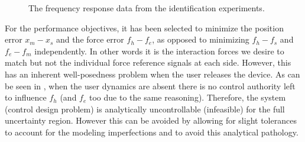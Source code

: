 \begin{figure}%
\centering
{}
\caption{The frequency response data from the identification experiments.}%
\label{fig:app:idfrd}%
\end{figure}

For the performance objectives, it has been selected to minimize the position error $x_m-x_s$ and 
the force error $f_h-f_e$, as opposed to minimizing $f_h-f_s$ and $f_e-f_m$ independently. In other words
it is the interaction forces we desire to match but not the individual force reference signals at each side. 
However, this has an inherent well-posedness problem when the user releases the device. As can be seen in 
, when the user dynamics are absent there is no control authority left to influence 
$f_h$ (and $f_e$ too due to the same reasoning). Therefore, the system (control design problem) is analytically 
uncontrollable (infeasible) for the full uncertainty region. However this can be avoided by allowing for 
slight tolerances to account for the modeling imperfections and to avoid this analytical pathology. 

